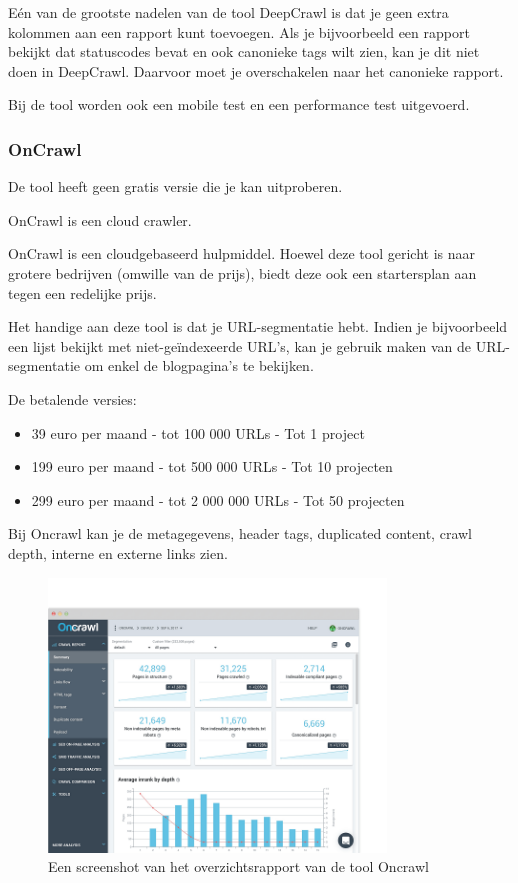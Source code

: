 Eén van de grootste nadelen van de tool DeepCrawl is dat je geen extra kolommen aan een rapport kunt toevoegen. Als je bijvoorbeeld een rapport bekijkt dat statuscodes bevat en ook canonieke tags wilt zien, kan je dit niet doen in DeepCrawl. Daarvoor moet je overschakelen naar het canonieke rapport.

Bij de tool worden ook een mobile test en een performance test uitgevoerd.

\newpage
\subsubsection{OnCrawl}
\label{ch: OnCrawl}
De tool heeft geen gratis versie die je kan uitproberen. 

OnCrawl is een cloud crawler. 

OnCrawl is een cloudgebaseerd hulpmiddel. Hoewel deze tool gericht is naar grotere bedrijven (omwille van de prijs), biedt deze ook een startersplan aan tegen een redelijke prijs. 

Het handige aan deze tool is dat je URL-segmentatie hebt. Indien je bijvoorbeeld een lijst bekijkt met niet-geïndexeerde URL's, kan je gebruik maken van de URL-segmentatie om enkel de blogpagina's te bekijken. 

De betalende versies: 
\begin{itemize}
\item 39 euro per maand - tot 100 000 URLs - Tot 1 project
\item 199 euro per maand - tot 500 000 URLs - Tot 10 projecten
\item 299 euro per maand - tot 2 000 000 URLs - Tot 50 projecten
\end{itemize}

Bij Oncrawl kan je de metagegevens, header tags, duplicated content, crawl depth, interne en externe links zien. 

\begin{figure}[h!]
\centering
\includegraphics[width=0.8\textwidth]{img/crawl-report.png}
\caption{Een screenshot van het overzichtsrapport van de tool Oncrawl
\autocite{oncrawl}}
\end{figure}

